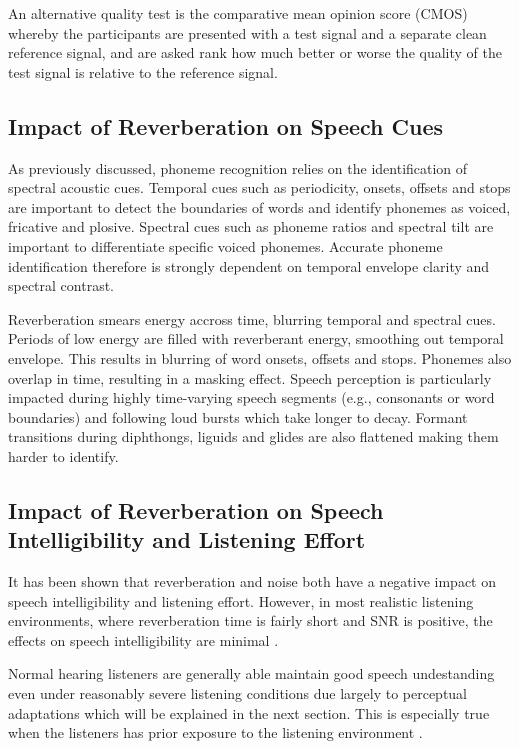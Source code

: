 An alternative quality test is the comparative mean opinion score (CMOS) whereby the participants are presented with a test signal and a separate clean reference signal, and are asked rank how much better or worse the quality of the test signal is relative to the reference signal.

\subsection{Impact of Reverberation on Speech Cues} \label{reverb_impact_speech_cues}

As previously discussed, phoneme recognition relies on the identification of spectral acoustic cues. Temporal cues such as periodicity, onsets, offsets and stops are important to detect the boundaries of words and identify phonemes as voiced, fricative and plosive. Spectral cues such as phoneme ratios and spectral tilt are important to differentiate specific voiced phonemes. Accurate phoneme identification therefore is strongly dependent on temporal envelope clarity and spectral contrast.

Reverberation smears energy accross time, blurring temporal and spectral cues. Periods of low energy are filled with reverberant energy, smoothing out temporal envelope. This results in blurring of word onsets, offsets and stops. Phonemes also overlap in time, resulting in a masking effect.  Speech perception is particularly impacted during highly time-varying speech segments (e.g., consonants or word boundaries) and following loud bursts which take longer to decay. Formant transitions during diphthongs, liguids and glides are also flattened making them harder to identify.

\subsection{Impact of Reverberation on Speech Intelligibility and Listening Effort}

It has been shown that reverberation and noise both have a negative impact on speech intelligibility and listening effort. However, in most realistic listening environments, where reverberation time is fairly short and SNR is positive, the effects on speech intelligibility are minimal \citep{schepker2016perceived}. 

Normal hearing listeners are generally able maintain good speech undestanding even under reasonably severe listening conditions \citep{schepker2016perceived} due largely to perceptual adaptations which will be explained in the next section. This is especially true when the listeners has prior exposure to the listening environment \citep{george2010measuring}.

